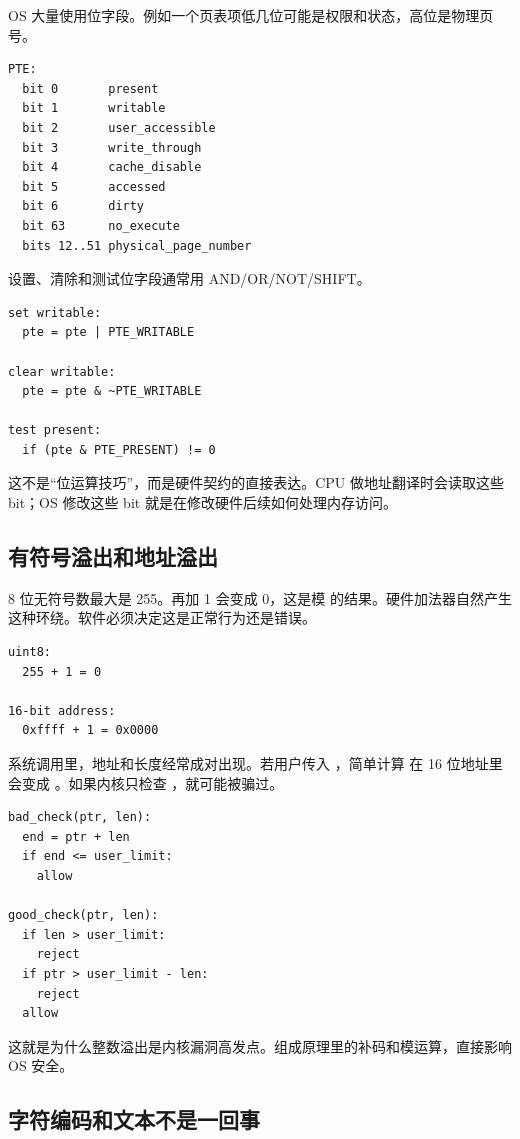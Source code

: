 OS 大量使用位字段。例如一个页表项低几位可能是权限和状态，高位是物理页号。

\begin{lstlisting}
PTE:
  bit 0       present
  bit 1       writable
  bit 2       user_accessible
  bit 3       write_through
  bit 4       cache_disable
  bit 5       accessed
  bit 6       dirty
  bit 63      no_execute
  bits 12..51 physical_page_number
\end{lstlisting}

设置、清除和测试位字段通常用 AND/OR/NOT/SHIFT。

\begin{lstlisting}
set writable:
  pte = pte | PTE_WRITABLE

clear writable:
  pte = pte & ~PTE_WRITABLE

test present:
  if (pte & PTE_PRESENT) != 0
\end{lstlisting}

这不是“位运算技巧”，而是硬件契约的直接表达。CPU 做地址翻译时会读取这些 bit；OS 修改这些 bit 就是在修改硬件后续如何处理内存访问。

\subsection{有符号溢出和地址溢出}

8 位无符号数最大是 255。再加 1 会变成 0，这是模  的结果。硬件加法器自然产生这种环绕。软件必须决定这是正常行为还是错误。

\begin{lstlisting}
uint8:
  255 + 1 = 0

16-bit address:
  0xffff + 1 = 0x0000
\end{lstlisting}

系统调用里，地址和长度经常成对出现。若用户传入 ，简单计算  在 16 位地址里会变成 。如果内核只检查 ，就可能被骗过。

\begin{lstlisting}
bad_check(ptr, len):
  end = ptr + len
  if end <= user_limit:
    allow

good_check(ptr, len):
  if len > user_limit:
    reject
  if ptr > user_limit - len:
    reject
  allow
\end{lstlisting}

这就是为什么整数溢出是内核漏洞高发点。组成原理里的补码和模运算，直接影响 OS 安全。

\subsection{字符编码和文本不是一回事}

